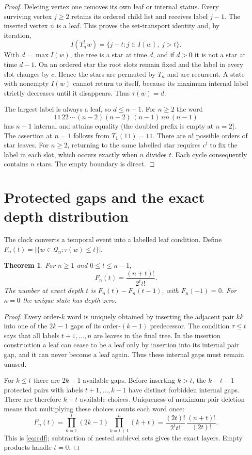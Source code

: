 \documentclass[a4paper,10pt]{amsart}
\newtheorem{theorem}{Theorem}[section]
\theoremstyle{remark}
\newcommand{\Q}{\mathcal Q}
\begin{document}
\begin{proof}
Deleting vertex one removes its own leaf or internal status. Every
surviving vertex $j\ge2$ retains its ordered child list and receives label
$j-1$. The inserted vertex $n$ is a leaf. This proves the set-transport
identity and, by iteration,
\[
 I(T_n^t w)=\{j-t:j\in I(w),\ j>t\}.
\]
With $d=\max I(w)$, the tree is a star at time $d$, and if $d>0$ it is
not a star at time $d-1$. On an ordered star the root slots remain fixed
and the label in every slot changes by $c$. Hence the stars are
permuted by $T_n$ and are recurrent. A state with nonempty $I(w)$
cannot return to itself, because its maximum internal label strictly
decreases until it disappears. Thus $\tau(w)=d$.

The largest label is always a leaf, so $d\le n-1$. For $n\ge2$ the word
\[
 11\,22\,\cdots\,(n-2)(n-2)\,(n-1)\,nn\,(n-1)
\]
has $n-1$ internal and attains equality (the doubled prefix is empty at
$n=2$). The assertion at $n=1$ follows
from $T_1(11)=11$. There are $n!$ possible orders of star leaves. For
$n\ge2$, returning to the same labelled star requires $c^t$ to fix the
label in each slot, which occurs exactly when $n$ divides $t$.
Each cycle consequently contains $n$ stars. The empty boundary is direct.
\end{proof}

\section{Protected gaps and the exact depth distribution}

The clock converts a temporal event into a labelled leaf condition.
Define $F_n(t)=|\{w\in\Q_n:\tau(w)\le t\}|$.

\begin{theorem}\label{thm:depth}
For $n\ge1$ and $0\le t\le n-1$,
\begin{equation}\label{eq:cdf}
 F_n(t)=\frac{(n+t)!}{2^t t!}.
\end{equation}
The number at exact depth $t$ is $F_n(t)-F_n(t-1)$, with $F_n(-1)=0$.
For $n=0$ the unique state has depth zero.
\end{theorem}

\begin{proof}
Every order-$k$ word is uniquely obtained by inserting the adjacent pair
$kk$ into one of the $2k-1$ gaps of its order-$(k-1)$ predecessor.
The condition $\tau\le t$ says that all labels $t+1,\ldots,n$ are
leaves in the final tree. In the insertion construction a leaf can cease
to be a leaf only by insertion into its internal pair gap, and it can
never become a leaf again. Thus these internal gaps must remain unused.

For $k\le t$ there are $2k-1$ available gaps. Before inserting $k>t$,
the $k-t-1$ protected pairs with labels $t+1,\ldots,k-1$ have distinct
forbidden internal gaps. There are therefore $k+t$ available choices.
Uniqueness of maximum-pair deletion means that multiplying these choices
counts each word once:
\[
 F_n(t)=
 \prod_{k=1}^{t}(2k-1)\prod_{k=t+1}^{n}(k+t)
 =\frac{(2t)!}{2^t t!}\,\frac{(n+t)!}{(2t)!}.
\]
This is \eqref{eq:cdf}; subtraction of nested sublevel sets gives the
exact layers. Empty products handle $t=0$.
\end{proof}
\end{document}
